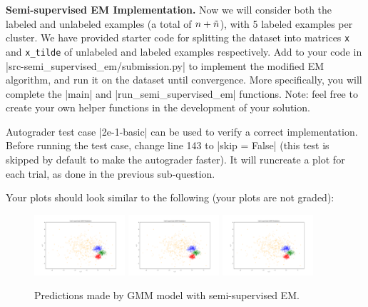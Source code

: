 \item {}
\textbf{Semi-supervised EM Implementation.}
Now we will consider both the labeled and unlabeled examples (a total of ${n} + \tilde{{n}}$), with 5 labeled examples per cluster. We have provided starter code for splitting the dataset into matrices \texttt{x} and \texttt{x\_tilde} of unlabeled and labeled examples respectively. Add to your code in |src-semi_supervised_em/submission.py| to implement the modified EM algorithm, and run it on the dataset until convergence.
More specifically, you will complete the |main| and |run_semi_supervised_em| functions. Note: feel free to create your own helper functions in the development of your solution.

Autograder test case |2e-1-basic| can be used to verify a correct implementation.  Before running the test case, change line 143 to |skip = False| (this test is skipped by default to make the autograder faster).  It will runcreate a plot for each trial, as done in the previous sub-question.

Your plots should look similar to the following (your plots are not graded):

  \begin{figure}[H]
    \centering
    \includegraphics[width=0.3\textwidth]{02-semi_supervised_em/pred_ss_0.pdf}
    \includegraphics[width=0.3\textwidth]{02-semi_supervised_em/pred_ss_1.pdf}
    \includegraphics[width=0.3\textwidth]{02-semi_supervised_em/pred_ss_2.pdf}
    \caption{Predictions made by GMM model with semi-supervised EM.}
  \end{figure}
